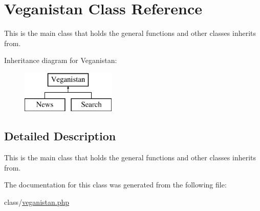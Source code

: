 \hypertarget{class_veganistan}{}\section{Veganistan Class Reference}
\label{class_veganistan}


This is the main class that holds the general functions and other classes inherits from.  


Inheritance diagram for Veganistan\+:\begin{figure}[H]
\begin{center}
\leavevmode
\includegraphics[height=2.000000cm]{class_veganistan}
\end{center}
\end{figure}


\subsection{Detailed Description}
This is the main class that holds the general functions and other classes inherits from. 

The documentation for this class was generated from the following file\+:\begin{DoxyCompactItemize}
\item 
class/\hyperlink{veganistan_8php}{veganistan.\+php}\end{DoxyCompactItemize}
